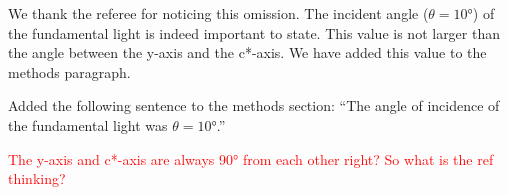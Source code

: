 We thank the referee for noticing this omission.
The incident angle ($\theta=\ang{10}$) of the fundamental light is indeed important to state.
This value is not larger than the angle between the y-axis and the c*-axis.
We have added this value to the methods paragraph.

\begin{changesmade}
Added the following sentence to the methods section: ``The angle of incidence of the fundamental light was $\theta=\ang{10}$.''
\end{changesmade}

\textcolor{red}{The y-axis and c*-axis are always \ang{90} from each other right?
So what is the ref thinking?}

% 
% 

